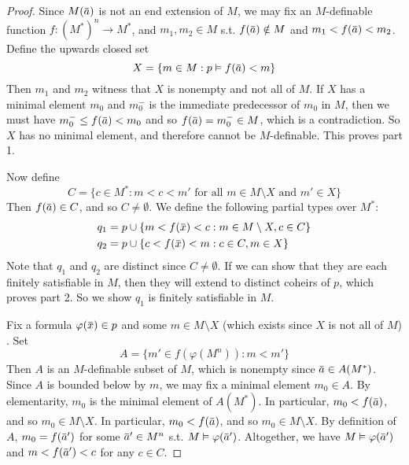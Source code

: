 \documentclass[11pt]{article}
\begin{document}
\begin{proof}
Since \(M(\bara)\) is not an end extension of \(M\), we may fix an \(M\)-definable
function \(f:(M^*)^n\to M^*\), and \(m_1,m_2\in M\) s.t. \(f(\bara)\notin M\) and \(m_1<f(\bara)<m_2\). Define
the upwards closed set
\begin{equation*}
X=\{m\in M:p\vDash f(\bara)<m\}
\end{equation*}
Then \(m_1\) and \(m_2\) witness that \(X\) is nonempty and not all of \(M\). If \(X\) has a
minimal element \(m_0\) and \(m_0^-\) is the immediate predecessor of \(m_0\) in \(M\), then we
must have \(m_0^-\le f(\bara)<m_0\) and so \(f(\bara)=m_0^-\in M\), which is a contradiction. So \(X\)
has no minimal element, and therefore cannot be \(M\)-definable. This proves part 1.

Now define
\begin{equation*}
C=\{c\in M^*:m<c<m'\text{ for all }m\in M\setminus X\text{ and }m'\in X\}
\end{equation*}
Then \(f(\bara)\in C\), and so \(C\neq\emptyset\). We define the following partial types over \(M^*\):
\begin{align*}
q_1&=p\cup\{m<f(\barx)<c:m\in M\setminus X,c\in C\}\\
q_2&=p\cup\{c<f(\barx)<m:c\in C,m\in X\}
\end{align*}
Note that \(q_1\) and \(q_2\) are distinct since \(C\neq\emptyset\). If we can show that they are each
finitely satisfiable in \(M\), then they will extend to distinct coheirs of \(p\), which proves
part 2. So we show \(q_1\) is finitely satisfiable in \(M\).

Fix a formula \(\varphi(\barx)\in p\) and some \(m\in M\setminus X\) (which exists since \(X\) is not all
of \(M\)) . Set
\begin{equation*}
A=\{m'\in f(\varphi(M^n)):m<m'\}
\end{equation*}
Then \(A\) is an \(M\)-definable subset of \(M\), which is nonempty since \(\bara\in A(M^*)\).
Since \(A\) is bounded below by \(m\), we may fix a minimal element \(m_0\in A\). By
elementarity, \(m_0\) is the minimal element of \(A(M^*)\). In particular, \(m_0<f(\bara)\), and
so \(m_0\in M\setminus X\). In particular, \(m_0<f(\bara)\), and so \(m_0\in M\setminus X\). By definition
of \(A\), \(m_0=f(\bara')\) for some \(\bara'\in M^n\) s.t. \(M\vDash\varphi(\bara')\). Altogether, we
have \(M\vDash\varphi(\bara')\) and \(m<f(\bara')<c\) for any \(c\in C\).
\end{proof}
\end{document}
